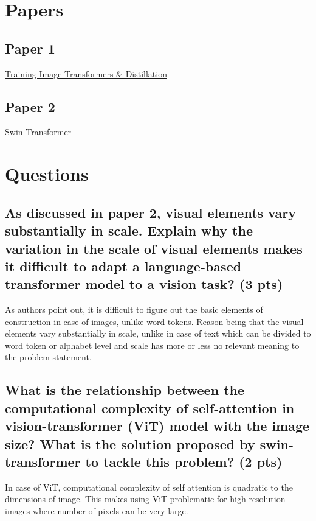 \documentclass{article}
\title{\mathbf{Discussion Quiz \#8}}
\author{{Ashutosh Tiwari (ashutiwa@iu.edu)}}
\begin{document}
\maketitle

\section{Papers}
\subsection{Paper 1}
    \href{https://arxiv.org/pdf/2012.12877.pdf}{Training Image Transformers & Distillation}
\subsection{Paper 2}
    \href{https://arxiv.org/pdf/2103.14030.pdf}{Swin Transformer}

\section{Questions}

\subsection{As discussed in paper 2, visual elements vary substantially in scale. Explain why the variation in the scale of visual elements makes it difficult to adapt a language-based transformer model to a vision task? (3 pts)}

As authors point out, it is difficult to figure out the basic elements of construction in case of images, unlike word tokens. Reason being that the visual elements vary substantially in scale, unlike in case of text which can be divided to word token or alphabet level and scale has more or less no relevant meaning to the problem statement.


\subsection{What is the relationship between the computational complexity of self-attention in vision-transformer (ViT) model with the image size? What is the solution proposed by swin-transformer to tackle this problem? (2 pts)}

In case of ViT, computational complexity of self attention is quadratic to the dimensions of image. This makes using ViT problematic for high resolution images where number of pixels can be very large. 
\end{document}
